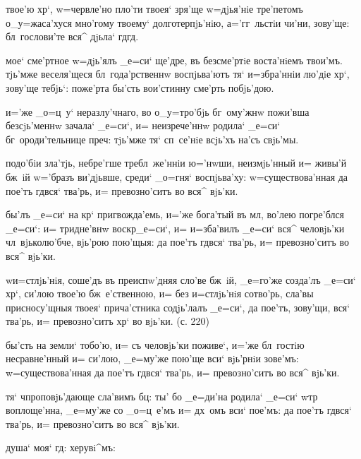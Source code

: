  твое'ю хр`, w=червле'но пло'ти твоея` 
зря'ще w=дjья'нiе тре'петомъ о_у=жаса'хуся мно'гому 
твоему` долготерпjь'нiю, а='гг~льстiи чи'ни, зову'ще: 
бл~гослови'те вся^ дjьла` гд гд.

 мое` сме'ртное w=дjь'ялъ _е=си` ще'дре, въ 
безсме'ртiе воста'нiемъ твои'мъ. тjь'мже веселя'щеся 
бл~года'рственнw воспjьва'ютъ тя` и=збра'ннiи лю'дiе 
хр`, зову'ще тебjь`: поже'рта бы'сть вои'стинну 
сме'рть побjь'дою.

  и='же _о=ц~у` неразлу'чнаго, во 
о_у=тро'бjь бг~ому'жнw пожи'вша безсjь'меннw зачала` 
_е=си`, и= неизрече'ннw родила` _е=си` бг~ороди'тельнице 
преч: тjь'мже тя` сп~се'нiе всjь'хъ на'съ свjь'мы.


 подо'бiи зла'тjь, небре'гше 
требл~же'ннiи ю='нwши, неизмjь'нный и= живы'й бж~iй 
w='бразъ ви'дjьвше, среди` _о=гня` воспjьва'ху: 
w=существова'нная да пое'тъ гд вся` тва'рь, и= 
превозно'ситъ во вся^ вjь'ки.

 бы'лъ _е=си` на кр` пригвожда'емь, 
и='же бога'тый въ мл, во'лею погре'блся _е=си`: и= 
тридне'внw воскр _е=си`, и= и=зба'вилъ _е=си` вся^ 
человjь'ки чл~вjьколю'бче, вjь'рою пою'щыя: да пое'тъ 
гд вся` тва'рь, и= превозно'ситъ во вся^ вjь'ки.

 w\т и=стлjь'нiя, соше'дъ въ 
преиспw'дняя сло'ве бж~iй, _е=го'же созда'лъ _е=си` 
хр`, си'лою твое'ю бж~е'ственною, и= без\ъ 
и=стлjь'нiя сотво'рь, сла'вы присносу'щныя твоея` 
прича'стника содjь'лалъ _е=си`, да пое'тъ, зову'щи, вся` 
тва'рь, и= превозно'ситъ хр` во вjь'ки. (с. 220)


 бы'сть на земли` тобо'ю, и= съ человjь'ки 
поживе`, и='же бл~гостiю несравне'нный и= си'лою, 
_е=му'же пою'ще вси` вjь'рнiи зове'мъ: w=существова'нная 
да пое'тъ гд вся` тва'рь, и= превозно'ситъ во вся^ 
вjь'ки.

 тя` ч проповjь'дающе сла'вимъ 
бц: ты' бо _е=ди'на родила` _е=си` w\т тр 
воплоще'нна, _е=му'же со _о=ц~е'мъ и= дх~омъ вси` пое'мъ: 
да пое'тъ гд вся` тва'рь, и= превозно'ситъ во вся^ 
вjь'ки.

     душа` моя` 
гд:    херувi^мъ:

